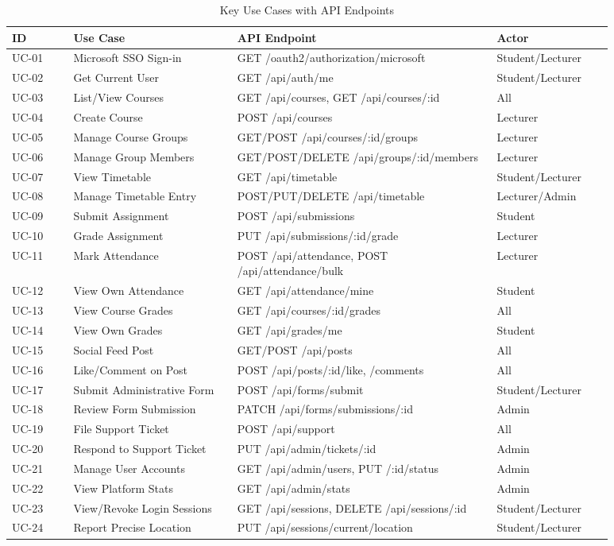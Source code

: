 \documentclass[12pt,a4paper]{report}
\begin{document}
\begin{longtable}{@{}p{0.09\linewidth}p{0.24\linewidth}p{0.38\linewidth}p{0.17\linewidth}@{}}
\caption{Key Use Cases with API Endpoints}
\label{tab:usecases}\\
\toprule
\textbf{ID} & \textbf{Use Case} & \textbf{API Endpoint} & \textbf{Actor} \\
\midrule
\endhead
UC-01 & Microsoft SSO Sign-in & GET /oauth2/authorization/microsoft & Student/Lecturer \\
UC-02 & Get Current User & GET /api/auth/me & Student/Lecturer \\
UC-03 & List/View Courses & GET /api/courses, GET /api/courses/:id & All \\
UC-04 & Create Course & POST /api/courses & Lecturer \\
UC-05 & Manage Course Groups & GET/POST /api/courses/:id/groups & Lecturer \\
UC-06 & Manage Group Members & GET/POST/DELETE /api/groups/:id/members & Lecturer \\
UC-07 & View Timetable & GET /api/timetable & Student/Lecturer \\
UC-08 & Manage Timetable Entry & POST/PUT/DELETE /api/timetable & Lecturer/Admin \\
UC-09 & Submit Assignment & POST /api/submissions & Student \\
UC-10 & Grade Assignment & PUT /api/submissions/:id/grade & Lecturer \\
UC-11 & Mark Attendance & POST /api/attendance, POST /api/attendance/bulk & Lecturer \\
UC-12 & View Own Attendance & GET /api/attendance/mine & Student \\
UC-13 & View Course Grades & GET /api/courses/:id/grades & All \\
UC-14 & View Own Grades & GET /api/grades/me & Student \\
UC-15 & Social Feed Post & GET/POST /api/posts & All \\
UC-16 & Like/Comment on Post & POST /api/posts/:id/like, /comments & All \\
UC-17 & Submit Administrative Form & POST /api/forms/submit & Student/Lecturer \\
UC-18 & Review Form Submission & PATCH /api/forms/submissions/:id & Admin \\
UC-19 & File Support Ticket & POST /api/support & All \\
UC-20 & Respond to Support Ticket & PUT /api/admin/tickets/:id & Admin \\
UC-21 & Manage User Accounts & GET /api/admin/users, PUT /:id/status & Admin \\
UC-22 & View Platform Stats & GET /api/admin/stats & Admin \\
UC-23 & View/Revoke Login Sessions & GET /api/sessions, DELETE /api/sessions/:id & Student/Lecturer \\
UC-24 & Report Precise Location & PUT /api/sessions/current/location & Student/Lecturer \\
\bottomrule
\end{longtable}
\end{document}
